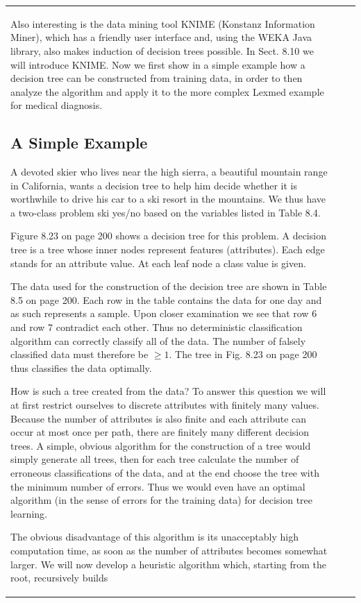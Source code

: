 \documentclass[10pt]{book}
\begin{document}
\begin{center}
\begin{tabular}{|l|l|l|}
Also interesting is the data mining tool KNIME (Konstanz Information Miner), which has a friendly user interface and, using the WEKA Java library, also makes induction of decision trees possible. In Sect. 8.10 we will introduce KNIME.
Now we first show in a simple example how a decision tree can be constructed from training data, in order to then analyze the algorithm and apply it to the more complex Lexmed example for medical diagnosis.

\subsection{A Simple Example}
A devoted skier who lives near the high sierra, a beautiful mountain range in California, wants a decision tree to help him decide whether it is worthwhile to drive his car to a ski resort in the mountains. We thus have a two-class problem ski yes/no based on the variables listed in Table 8.4.

Figure 8.23 on page 200 shows a decision tree for this problem. A decision tree is a tree whose inner nodes represent features (attributes). Each edge stands for an attribute value. At each leaf node a class value is given.

The data used for the construction of the decision tree are shown in Table 8.5 on page 200. Each row in the table contains the data for one day and as such represents a sample. Upon closer examination we see that row 6 and row 7 contradict each other. Thus no deterministic classification algorithm can correctly classify all of the data. The number of falsely classified data must therefore be $\geq 1$. The tree in Fig. 8.23 on page 200 thus classifies the data optimally.

How is such a tree created from the data? To answer this question we will at first restrict ourselves to discrete attributes with finitely many values. Because the number of attributes is also finite and each attribute can occur at most once per path, there are finitely many different decision trees. A simple, obvious algorithm for the construction of a tree would simply generate all trees, then for each tree calculate the number of erroneous classifications of the data, and at the end choose the tree with the minimum number of errors. Thus we would even have an optimal algorithm (in the sense of errors for the training data) for decision tree learning.

The obvious disadvantage of this algorithm is its unacceptably high computation time, as soon as the number of attributes becomes somewhat larger. We will now develop a heuristic algorithm which, starting from the root, recursively builds\\


\end{tabular}
\end{center}
\end{document}
